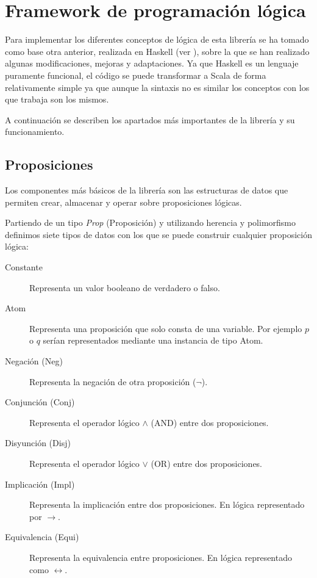 \section*{Framework de programación lógica}

	Para implementar los diferentes conceptos de lógica de esta librería se ha tomado como base otra anterior, realizada en Haskell (ver \cite{haskell}), sobre la que se han realizado algunas modificaciones, mejoras y adaptaciones. Ya que Haskell es un lenguaje puramente funcional, el código se puede transformar a Scala de forma relativamente simple ya que aunque la sintaxis no es similar los conceptos con los que trabaja son los mismos.
	
	A continuación se describen los apartados más importantes de la librería y su funcionamiento.
	

\subsection*{Proposiciones}

	Los componentes más básicos de la librería son las estructuras de datos que permiten crear, almacenar y operar sobre proposiciones lógicas.
	
	Partiendo de un tipo \textit{Prop} (Proposición) y utilizando herencia y polimorfismo definimos siete tipos de datos con los que se puede construir cualquier proposición lógica:
	
	\begin{description}
		\item[Constante] Representa un valor booleano de verdadero o falso.
		\item[Atom] Representa una proposición que solo consta de una variable. Por ejemplo $p$ o $q$ serían representados mediante una instancia de tipo Atom.
		\item[Negación (Neg)] Representa la negación de otra proposición ($\neg$).
		\item[Conjunción (Conj)] Representa el operador lógico $\wedge$ (AND) entre dos proposiciones.
		\item[Disyunción (Disj)] Representa el operador lógico $\vee$ (OR) entre dos proposiciones.
		\item[Implicación (Impl)] Representa la implicación entre dos proposiciones. En lógica representado por $\rightarrow$.
		\item[Equivalencia (Equi)] Representa la equivalencia entre proposiciones. En lógica representado como $\leftrightarrow$.
	\end{description}

